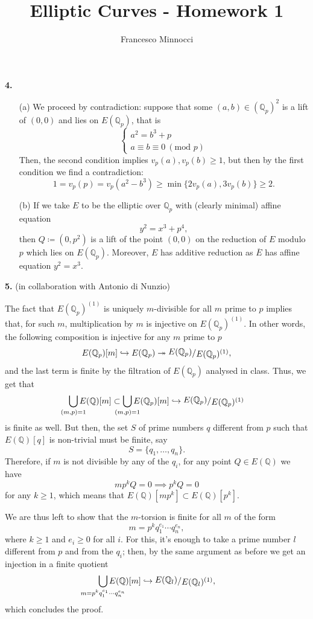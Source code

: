 \documentclass[a4paper]{article}
\title{Elliptic Curves - Homework 1}
\author{Francesco Minnocci}
\newcommand{\Q}{\mathbb{Q}}
\newcommand{\Qp}{\Q_p}
\newcommand{\E}{E(\Qp)^{(1)}}
\newcommand{\ssfrac}[2]{
        \raisebox{+0.3ex}{$#1$}
        /
        \raisebox{-0.3ex}{$#2$}
}
\theoremstyle{definition}
\theoremstyle{definition}
\theoremstyle{remark}
\theoremstyle{definition}
\begin{document}
\maketitle

\textbf{4. }
\begin{itemize}
    \item[(a)] We proceed by contradiction: suppose that some $(a,b)\in(\Qp)^2$ is a lift of $(0,0)$ and lies on $E(\Qp)$, that is
        \[
            \begin{cases}
                a^2=b^3+p \\
                a\equiv b\equiv 0 ~(\text{mod } p)
            \end{cases}
        \]
        Then, the second condition implies $v_p(a),v_p(b)\geq 1$, but then by the first condition
        we find a contradiction:
        \[
            1=v_p(p)=v_p(a^2-b^3)\geq \min\{2v_p(a),3v_p(b)\}   \geq 2.
        \]

    \item[(b)] If we take $E$ to be the elliptic over $\Qp$ with (clearly minimal) affine equation
        \[
            y^2=x^3+p^4,
        \]
        then $Q\coloneqq (0,p^2)$ is a lift of the point $(0,0)$ on the reduction of $E$ modulo $p$ which lies on $E(\Qp)$. Moreover, $E$ has additive reduction as $\overline{E}$ has affine equation $y^2=x^3$.
\end{itemize}

\textbf{5. }(in collaboration with Antonio di Nunzio)

The fact that $\E$ is uniquely $m$-divisible for all $m$ prime to $p$ implies that, for such $m$, multiplication by $m$ is injective on $\E$.
In other words, the following composition is injective for any $m$ prime to $p$
\[
    E(\Qp)[m] \hookrightarrow E(\Qp) \twoheadrightarrow \ssfrac{E(\Qp)}{\E},
\]
and the last term is finite by the filtration of $E(\Qp)$ analysed in class. Thus, we get that
\[
    \bigcup_{\mathclap{{(m,p)=1}}} E(\Q)[m]\subset \bigcup_{\mathclap{{(m,p)=1}}} E(\Qp)[m] \hookrightarrow \ssfrac{E(\Qp)}{\E}
\]
is finite as well. But then, the set $S$ of prime numbers $q$ different from $p$ such that $E(\Q)[q]$ is non-trivial must be finite, say
\[
    S=\{q_1,\ldots,q_n\}.
\]
Therefore, if $m$ is not divisible by any of the $q_i$, for any point $Q\in E(\Q)$ we have
\[
    m p^k Q = 0 \implies p^k Q = 0
\]
for any $k\geq 1$, which means that $E(\Q)[m p^k]\subset E(\Q)[p^k]$.

We are thus left to show that the $m$-torsion is finite for all $m$ of the form \[m=p^k q_1^{e_1}\cdots q_n^{e_n},\] where $k\geq 1$ and $e_i\geq 0$ for all $i$. For this, it's enough to take a prime number $l$ different from $p$ and from the $q_i$; then, by the same argument as before we get an injection in a finite quotient
\[
    \bigcup_{\mathclap{m=p^k q_1^{e_1}\cdots q_n^{e_n}}}{E(\Q)[m]} \hookrightarrow \ssfrac{E(\Q_l)}{E(\Q_l)^{(1)}},
\]
which concludes the proof.
\end{document}
